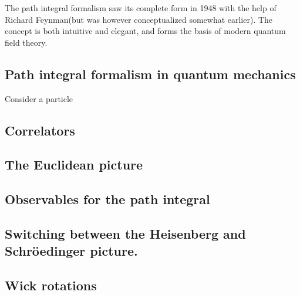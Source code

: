 The path integral formalism saw its complete form in 1948 with the help of Richard Feynman\cite{RevModPhys.20.367}(but was however conceptualized somewhat earlier). The concept is both intuitive and elegant, and forms the basis of modern quantum field theory.

\subsection{Path integral formalism in quantum mechanics}
Consider a particle 

\subsection{Correlators}

\subsection{The Euclidean picture}

\subsection{Observables for the path integral}

\subsection{Switching between the Heisenberg and Schröedinger picture.}

\subsection{Wick rotations}




